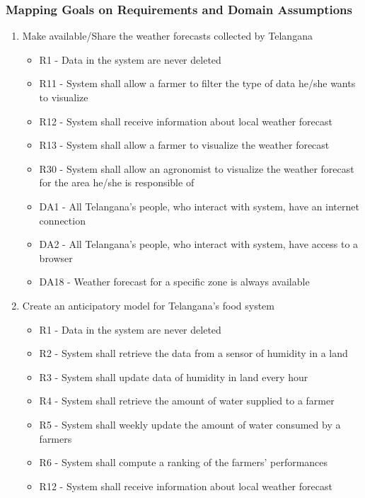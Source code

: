 \subsubsection{Mapping Goals on Requirements and Domain Assumptions}
\begin{enumerate}[label=\textbf{G.\arabic*}]
    \item Make available/Share the weather forecasts collected by Telangana
    \begin{itemize} [label =]
        \item R1 - Data in the system are never deleted
        \item R11 - System shall allow a farmer to filter the type of data he/she wants to visualize
        \item R12 - System shall receive information about local weather forecast
        \item R13 - System shall allow a farmer to visualize the weather forecast
        \item R30 - System shall allow an agronomist to visualize the weather forecast for the area he/she is responsible of
        \item DA1 - All Telangana’s people, who interact with system, have an internet connection
        \item DA2 - All Telangana’s people, who interact with system, have access to a browser
        \item DA18 - Weather forecast for a specific zone is always available
    \end{itemize}
    \item Create an anticipatory model for Telangana’s food system
    \begin{itemize} [label =]
        \item R1 - Data in the system are never deleted
        \item R2 - System shall retrieve the data from a sensor of humidity in a land
        \item R3 - System shall update data of humidity in land every hour
        \item R4 - System shall retrieve the amount of water supplied to a farmer
        \item R5 - System shall weekly update the amount of water consumed by a farmers 
        \item R6 - System shall compute a ranking of the farmers’ performances
        \item R12 - System shall receive information about local weather forecast

\end{itemize}
\end{enumerate}
